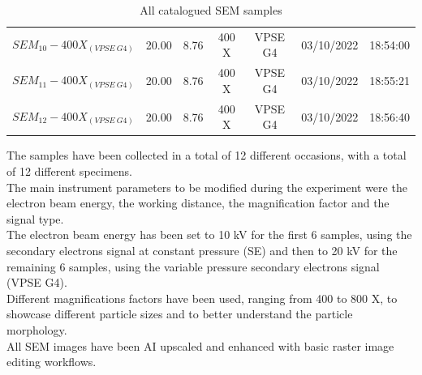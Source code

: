 \documentclass{article}
\begin{document}
\begin{table}[h!]
{\begin{tabular}{@{}ccccccc@{}}
                        \textbf{$SEM_{10}-400X_{(VPSE \ G4)}$} & 20.00                 & 8.76                 & 400 X         & VPSE G4  & 03/10/2022                     & 18:54:00                     \\
                        \textbf{$SEM_{11}-400X_{(VPSE \ G4)}$} & 20.00                 & 8.76                 & 400 X         & VPSE G4  & 03/10/2022                     & 18:55:21                     \\
                        \textbf{$SEM_{12}-400X_{(VPSE \ G4)}$} & 20.00                 & 8.76                 & 400 X         & VPSE G4  & 03/10/2022                     & 18:56:40                     \\ \bottomrule
                    \end{tabular}%
                }
                \caption{All catalogued SEM samples}
                \label{tab:SEM_samples_catalogue}
            \end{table}

            The samples have been collected in a total of 12 different occasions, with a total of 12 different specimens. \\

            The main instrument parameters to be modified during the experiment were the electron beam energy, the working distance, the magnification 
            factor and the signal type.  \\
            The electron beam energy has been set to 10 kV for the first 6 samples, using the secondary electrons signal at constant pressure (SE)
            and then to 20 kV for the remaining 6 samples, using the variable pressure secondary electrons signal (VPSE G4). \\

            Different magnifications factors have been used, ranging from 400 to 800 X, to showcase different particle sizes and to better understand 
            the particle morphology. \\

            All SEM images have been AI upscaled and enhanced with basic raster image editing workflows. \\ 
\end{document}
